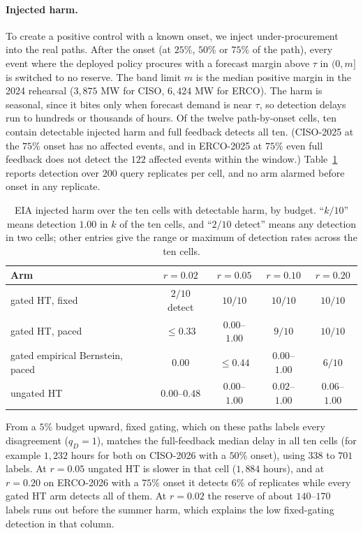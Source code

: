 \paragraph{Injected harm.}
To create a positive control with a known onset, we inject under-procurement into the real paths. After the onset (at $25\%$, $50\%$ or $75\%$ of the path), every event where the deployed policy procures
with a forecast margin above $\tau$ in $(0,m]$ is switched to no reserve. The band limit $m$ is the median positive margin in the 2024 rehearsal ($3{,}875$ MW for CISO, $6{,}424$ MW for ERCO).
The harm is seasonal, since it bites only when forecast demand is near $\tau$, so detection delays run to hundreds or thousands of hours.
Of the twelve path-by-onset cells, ten contain detectable injected harm and full feedback detects all ten.
(CISO-2025 at the $75\%$ onset has no affected events, and in ERCO-2025 at $75\%$ even full feedback does not detect the $122$ affected events within the window.)
Table~\ref{tab:eia} reports detection over $200$ query replicates per cell, and no arm alarmed before onset in any replicate.

\begin{table}[t]
\centering
\caption{EIA injected harm over the ten cells with detectable harm, by budget. ``$k/10$'' means detection $1.00$ in $k$ of the ten cells, and ``$2/10$ detect'' means any detection in two cells; other entries give the range or maximum of detection rates across the ten cells.}
\label{tab:eia}
\begin{tabular}{lcccc}
\toprule
Arm & $r=0.02$ & $r=0.05$ & $r=0.10$ & $r=0.20$ \\
\midrule
gated HT, fixed & $2/10$ detect & $10/10$ & $10/10$ & $10/10$ \\
gated HT, paced & $\le0.33$ & $0.00$--$1.00$ & $9/10$ & $10/10$ \\
gated empirical Bernstein, paced & $0.00$ & $\le0.44$ & $0.00$--$1.00$ & $6/10$ \\
ungated HT & $0.00$--$0.48$ & $0.00$--$1.00$ & $0.02$--$1.00$ & $0.06$--$1.00$ \\
\bottomrule
\end{tabular}
\end{table}

From a $5\%$ budget upward, fixed gating, which on these paths labels every disagreement ($q_D=1$), matches the full-feedback median delay in all ten cells (for example $1{,}232$ hours for both on CISO-2026 with a $50\%$ onset), using $338$ to $701$ labels.
At $r=0.05$ ungated HT is slower in that cell ($1{,}884$ hours), and at $r=0.20$ on ERCO-2026 with a $75\%$ onset it detects $6\%$ of replicates while every gated HT arm detects all of them.
At $r=0.02$ the reserve of about $140$--$170$ labels runs out before the summer harm, which explains the low fixed-gating detection in that column.

